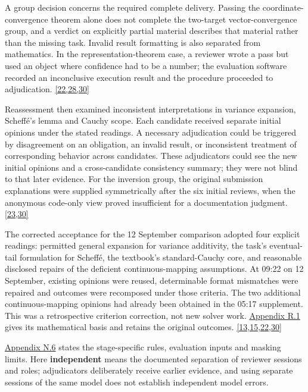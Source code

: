 A group decision concerns the required complete delivery. Passing the coordinate-convergence theorem alone does not complete the two-target vector-convergence group, and a verdict on explicitly partial material describes that material rather than the missing task. Invalid result formatting is also separated from mathematics. In the representation-theorem case, a reviewer wrote a pass but used an object where confidence had to be a number; the evaluation software recorded an inconclusive execution result and the procedure proceeded to adjudication. \hyperlink{ref-22}{\mbox{[22,28,30]}}

Reassessment then examined inconsistent interpretations in variance expansion, Scheffé's lemma and Cauchy scope. Each candidate received separate initial opinions under the stated readings. A necessary adjudication could be triggered by disagreement on an obligation, an invalid result, or inconsistent treatment of corresponding behavior across candidates. These adjudicators could see the new initial opinions and a cross-candidate consistency summary; they were not blind to that later evidence. For the inversion group, the original submission explanations were supplied symmetrically after the six initial reviews, when the anonymous code-only view proved insufficient for a documentation judgment. \hyperlink{ref-23}{\mbox{[23,30]}}

The corrected acceptance for the 12 September comparison adopted four explicit readings: permitted general expansion for variance additivity, the task's eventual-tail formulation for Scheffé, the textbook's standard-Cauchy core, and reasonable disclosed repairs of the deficient continuous-mapping assumptions. At 09:22 on 12 September, existing opinions were reused, determinable format mismatches were repaired and outcomes were recomposed under those criteria. The two additional continuous-mapping opinions had already been obtained in the 05:17 supplement. This was a retrospective criterion correction, not new solver work. \href{en-appendix.pdf\#r1}{Appendix R.1} gives its mathematical basis and retains the original outcomes. \hyperlink{ref-13}{\mbox{[13,15,22,30]}}

\href{en-appendix.pdf\#n6}{Appendix N.6} states the stage-specific rules, evaluation inputs and masking limits. Here \textbf{independent} means the documented separation of reviewer sessions and roles; adjudicators deliberately receive earlier evidence, and using separate sessions of the same model does not establish independent model errors.

